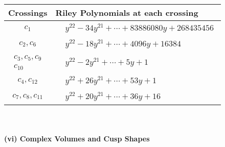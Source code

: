 \documentclass[1p]{elsarticle_modified}
\theoremstyle{definition}
\begin{document}
\begin{tabular}{m{50pt}|m{274pt}}
Crossings & \hspace{64pt}Riley Polynomials at each crossing \\
\hline $$\begin{aligned}c_{1}\end{aligned}$$&$\begin{aligned}
&y^{22}-34 y^{21}+\cdots+83886080 y+268435456
\end{aligned}$\\
\hline $$\begin{aligned}c_{2},c_{6}\end{aligned}$$&$\begin{aligned}
&y^{22}-18 y^{21}+\cdots+4096 y+16384
\end{aligned}$\\
\hline $$\begin{aligned}c_{3},c_{5},c_{9}\\c_{10}\end{aligned}$$&$\begin{aligned}
&y^{22}-2 y^{21}+\cdots+5 y+1
\end{aligned}$\\
\hline $$\begin{aligned}c_{4},c_{12}\end{aligned}$$&$\begin{aligned}
&y^{22}+26 y^{21}+\cdots+53 y+1
\end{aligned}$\\
\hline $$\begin{aligned}c_{7},c_{8},c_{11}\end{aligned}$$&$\begin{aligned}
&y^{22}+20 y^{21}+\cdots+36 y+16
\end{aligned}$\\
\hline
\end{tabular}\\~\\
\newpage\flushleft \textbf{(vi) Complex Volumes and Cusp Shapes}
\end{document}
